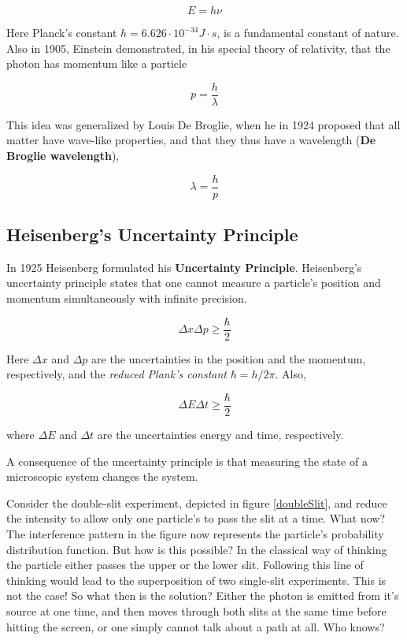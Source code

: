 \begin{equation*}
  E = h \nu
\end{equation*}

Here Planck's constant $h=6.626 \cdot 10^{-34} J \cdot s$, is a
fundamental constant of nature. Also in 1905, Einstein demonstrated, in
his special theory of relativity, that the photon has momentum like a
particle  

\begin{equation*}
  p = \frac{h} {\lambda}
\end{equation*}

This idea was generalized by Louis De Broglie, when he in 1924 proposed
that all matter have wave-like properties, and that they thus have a
wavelength ({\bf De Broglie wavelength}), 

\begin{equation*}
  \lambda = \frac{h} {p}
\end{equation*}



\subsection{Heisenberg's Uncertainty Principle}

In 1925 Heisenberg formulated his {\bf Uncertainty
  Principle}. Heisenberg's uncertainty principle states that one cannot
  measure a particle's position and momentum simultaneously with
  infinite precision.

\begin{equation*}
  \Delta x \Delta p \ge \frac{\hbar}{2}
\end{equation*}

Here $\Delta x$ and $\Delta p$ are the uncertainties in the position
and the momentum, respectively, and the \emph{reduced Plank's constant}
$\hbar = h/2\pi$. Also,

\begin{equation*}
  \Delta E \Delta t \ge \frac{\hbar}{2}
\end{equation*}

where $\Delta E$ and $\Delta t$ are the uncertainties energy and time,
respectively.

A consequence of the uncertainty principle is that
measuring the state of a microscopic system changes the system. 
\newline
%
\newline

Consider the double-slit experiment, depicted in figure
\ref{doubleSlit}, and reduce the intensity to allow only one
particle's to pass the slit at a time. What now? The interference
pattern in the figure now represents the particle's probability
distribution function. But how is this possible? In the classical way
of thinking the particle either passes the upper or the lower
slit. Following this line of thinking would lead to the superposition
of two single-slit experiments. This is not the case! So what then is
the solution? Either the photon is emitted from it's source at one
time, and then moves through both slits at the same time before
hitting the screen, or one simply cannot talk about a path at all.
Who knows?

